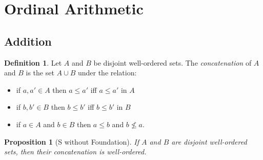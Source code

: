 \documentclass{book}
\newtheorem{prop}[ax]{Proposition}
\theoremstyle{definition}
\newtheorem{df}[ax]{Definition}
\begin{document}
\section{Ordinal Arithmetic}

\subsection{Addition}

\begin{df}
Let $A$ and $B$ be disjoint well-ordered sets. The \emph{concatenation} of $A$ and $B$ is the set $A \cup B$ under the relation:
\begin{itemize}
\item if $a,a' \in A$ then $a \leq a'$ iff $a \leq a'$ in $A$
\item if $b, b' \in B$ then $b \leq b'$ iff $b \leq b'$ in $B$
\item if $a \in A$ and $b \in B$ then $a \leq b$ and $b \not\leq a$.
\end{itemize}
\end{df}

\begin{prop}[S without Foundation]
If $A$ and $B$ are disjoint well-ordered sets, then their concatenation is well-ordered.
\end{prop}
\end{document}
